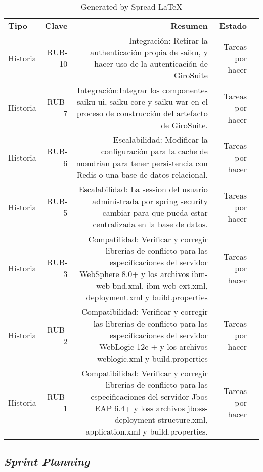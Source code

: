 \begin{spacing}{1.5}
	\begin{table}[!htp]\centering
		\caption{Generated by Spread-LaTeX}\label{tab: }
		\scriptsize
		\begin{tabular}{lrrrr}\toprule
			\cellcolor[HTML]{A8A8A8}\textbf{Tipo} &\cellcolor[HTML]{A8A8A8}\textbf{Clave} &\cellcolor[HTML]{A8A8A8}\textbf{Resumen} &\cellcolor[HTML]{A8A8A8}\textbf{Estado} \\\cmidrule{1-4}
			Historia &RUB-10 &Integración: Retirar la authenticación propia de saiku, y hacer uso de la autenticación de GiroSuite &Tareas por hacer \\\cmidrule{1-4}
			Historia &RUB-7 &Integración:Integrar los componentes saiku-ui, saiku-core y saiku-war en el proceso de construcción del artefacto de GiroSuite. &Tareas por hacer \\\cmidrule{1-4}
			Historia &RUB-6 &Escalabilidad: Modificar la configuración para la cache de mondrian para tener persistencia con Redis o una base de datos relacional. &Tareas por hacer \\\cmidrule{1-4}
			Historia &RUB-5 &Escalabilidad: La session del usuario administrada por spring security cambiar para que pueda estar centralizada en la base de datos. &Tareas por hacer \\\cmidrule{1-4}
			Historia &RUB-3 &Compatilidad: Verificar y corregir librerias de conflicto para las especificaciones del servidor WebSphere 8.0+ y los archivos ibm-web-bnd.xml, ibm-web-ext.xml, deployment.xml y build.properties &Tareas por hacer \\\cmidrule{1-4}
			Historia &RUB-2 &Compatibilidad: Verificar y corregir las librerias de conflicto para las especificaciones del servidor WebLogic 12c + y los archivos weblogic.xml y build.properties &Tareas por hacer \\\cmidrule{1-4}
			Historia &RUB-1 &Compatibilidad: Verificar y corregir librerias de conflicto para las especificaciones del servidor Jbos EAP 6.4+ y loss archivos jboss-deployment-structure.xml, application.xml y build.properties. &Tareas por hacer \\\midrule
			\bottomrule
		\end{tabular}
	\end{table}

	\subsection{\textit{Sprint Planning}}

\end{spacing}
